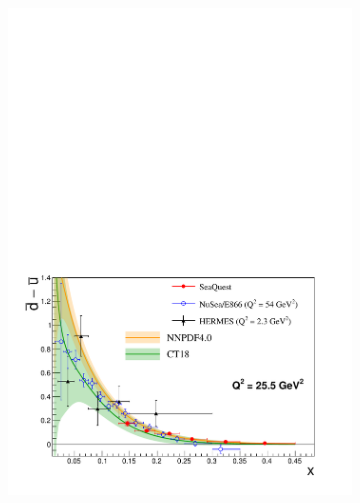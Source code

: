 \documentclass[reprint,aps,unsortedaddress,superscriptaddress,prc,floatfix,showpacs,linenumbers]{revtex4-2}
\begin{document}
\begin{figure}[htpb!]
	\centering
	\begin{subfigure}{\linewidth}
		\includegraphics[width=\linewidth]{dbub_diff_with_PDF.pdf}
	\end{subfigure}
	\begin{subfigure}{\linewidth}

\end{subfigure}
\end{figure}
\end{document}
